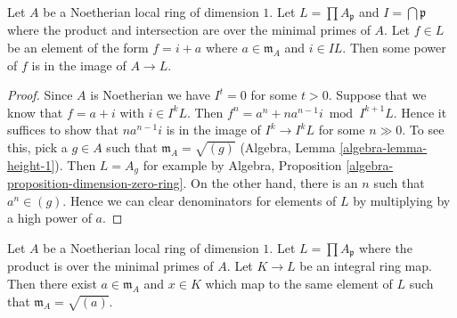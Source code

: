 \begin{lemma}
\label{lemma-power-works}
Let $A$ be a Noetherian local ring of dimension $1$.
Let $L = \prod A_\mathfrak p$ and $I = \bigcap \mathfrak p$
where the product and intersection are over
the minimal primes of $A$. Let $f \in L$ be an element
of the form $f = i + a$ where $a \in \mathfrak m_A$ and
$i \in IL$. Then some power of $f$ is in the image of $A \to L$.
\end{lemma}

\begin{proof}
Since $A$ is Noetherian we have $I^t = 0$ for some $t > 0$.
Suppose that we know that $f = a + i$ with $i \in I^kL$.
Then $f^n = a^n + na^{n - 1}i \bmod I^{k + 1}L$.
Hence it suffices to show that $na^{n - 1}i$ is in
the image of $I^k \to I^kL$ for some $n \gg 0$.
To see this, pick a $g \in A$ such that $\mathfrak m_A = \sqrt{(g)}$
(Algebra, Lemma \ref{algebra-lemma-height-1}). Then $L = A_g$ for example by
Algebra, Proposition \ref{algebra-proposition-dimension-zero-ring}.
On the other hand, there is an $n$ such that $a^n \in (g)$.
Hence we can clear denominators for elements of $L$
by multiplying by a high power of $a$.
\end{proof}

\begin{lemma}
\label{lemma-good-intersection}
Let $A$ be a Noetherian local ring of dimension $1$.
Let $L = \prod A_\mathfrak p$ where the product is over
the minimal primes of $A$. Let $K \to L$ be an integral ring map.
Then there exist $a \in \mathfrak m_A$ and $x \in K$
which map to the same element of $L$ such that $\mathfrak m_A = \sqrt{(a)}$.
\end{lemma}

